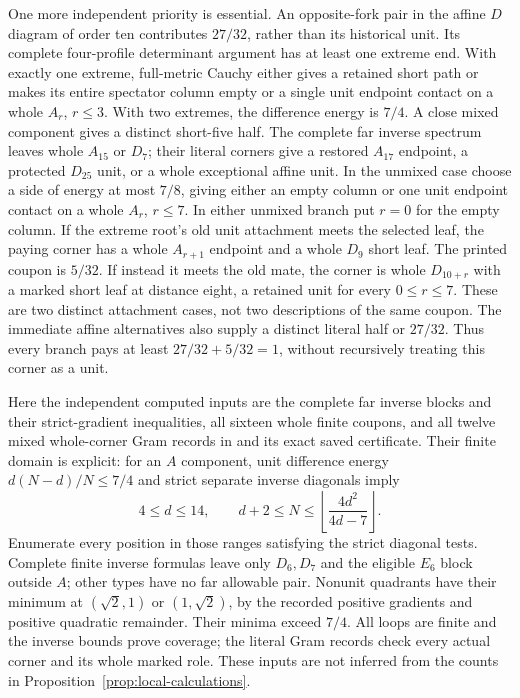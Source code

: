\documentclass[11pt]{article}
\theoremstyle{remark}\newtheorem{remark}[theorem]{Remark}
\begin{document}
One more independent priority is essential. An opposite-fork pair
in the affine $D$ diagram of order ten contributes $27/32$, rather
than its historical unit. Its complete four-profile determinant
argument has at least one extreme end. With exactly one extreme,
full-metric Cauchy either gives a retained short path or makes its
entire spectator column empty or a single unit endpoint contact
on a whole $A_r$, $r\le3$. With two extremes, the difference
energy is $7/4$.
A close mixed component gives a distinct short-five half. The
complete far inverse spectrum leaves whole $A_{15}$ or $D_7$;
their literal corners give a restored $A_{17}$ endpoint, a protected
$D_{25}$ unit, or a whole exceptional affine unit. In the unmixed
case choose a side of energy at most $7/8$, giving either an empty
column or one unit endpoint contact on a whole $A_r$, $r\le7$.
In either unmixed branch put $r=0$ for the empty column. If the
extreme root's old unit attachment meets the selected leaf, the
paying corner has a whole $A_{r+1}$ endpoint and a whole $D_9$
short leaf. The printed coupon is $5/32$. If instead it meets
the old mate, the corner is whole $D_{10+r}$ with a marked short
leaf at distance eight, a retained unit for every $0\le r\le7$.
These are two distinct attachment cases, not two descriptions of
the same coupon. The immediate affine alternatives also
supply a distinct literal half or $27/32$. Thus every branch pays
at least $27/32+5/32=1$, without recursively treating this corner
as a unit.

Here the independent computed inputs are the complete far inverse
blocks and their strict-gradient inequalities, all sixteen whole
finite coupons, and all twelve mixed whole-corner Gram records in
and its exact saved certificate. Their finite domain is explicit:
for an $A$ component, unit difference energy $d(N-d)/N\le7/4$
and strict separate inverse diagonals imply
\[
 4\le d\le14,\qquad d+2\le N\le
       \left\lfloor\frac{4d^2}{4d-7}\right\rfloor.
\]
Enumerate every position in those ranges satisfying the strict
diagonal tests. Complete finite inverse formulas leave only
$D_6,D_7$ and the eligible $E_6$ block outside $A$; other types
have no far allowable pair. Nonunit quadrants have their minimum
at $(\sqrt2,1)$ or $(1,\sqrt2)$, by the recorded positive gradients
and positive quadratic remainder. Their minima exceed $7/4$.
All loops are finite and the inverse bounds prove coverage; the
literal Gram records check every actual corner and its whole
marked role. These inputs are not inferred from the counts in
Proposition~\ref{prop:local-calculations}.
\end{document}

